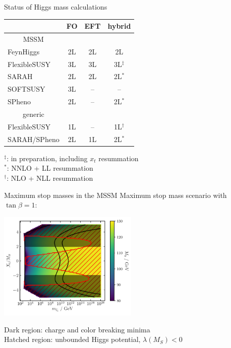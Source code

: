 \documentclass[hyperref={pdfpagelabels=false},ngerman]{beamer}
\newcommand{\MS}{\ensuremath{M_S}}
\begin{document}
\begin{frame}[noframenumbering]{Status of Higgs mass calculations}
  \begin{center}
  \begin{tabular}{lccc}
    \toprule
                 & FO & EFT & hybrid \\
    \midrule
    \multicolumn{1}{c}{MSSM} \\
    \midrule
    FeynHiggs    & 2L & 2L  & 2L \\
    FlexibleSUSY & 3L & 3L  & 3L$^\ddagger$ \\
    SARAH        & 2L & 2L  & 2L$^*$ \\
    SOFTSUSY     & 3L & --  & -- \\
    SPheno       & 2L & --  & 2L$^*$ \\
    \midrule
    \multicolumn{1}{c}{generic} \\
    \midrule
    FlexibleSUSY & 1L & --  & 1L$^\dagger$ \\
    SARAH/SPheno & 2L & 1L  & 2L$^*$ \\
    \bottomrule
  \end{tabular}
  \end{center}
  $^\ddagger$: in preparation, including $x_t$ resummation \\
  $^*$: NNLO + LL resummation \\
  $^\dagger$: NLO + NLL resummation
\end{frame}


\begin{frame}[noframenumbering]{Maximum stop masses in the MSSM}
  Maximum stop mass scenario with $\tan\beta = 1$:
  \begin{center}
    \includegraphics[width=0.5\textwidth]{plots/DMh/TB-1}
  \end{center}
  Dark region: charge and color breaking minima\\
  Hatched region: unbounded Higgs potential, $\lambda(\MS) < 0$
\end{frame}
\end{document}
